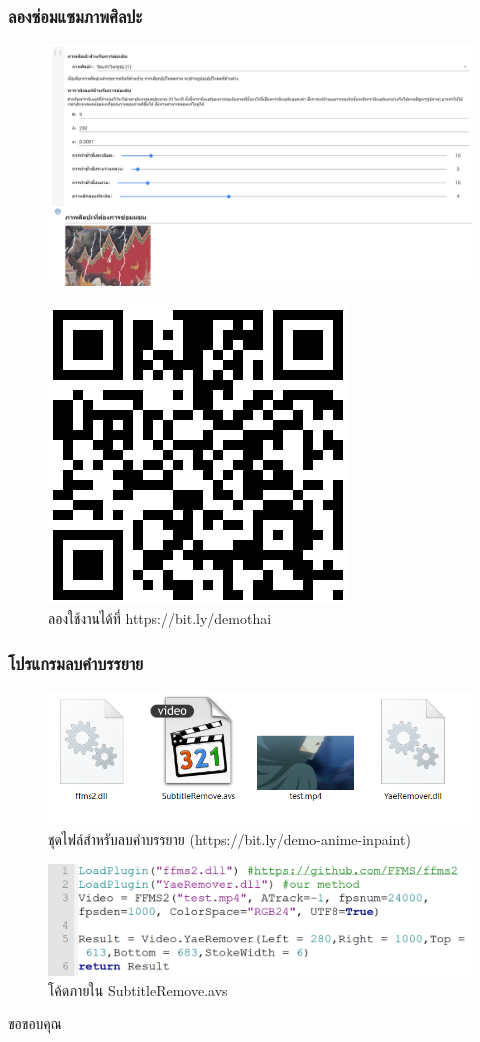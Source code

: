 \documentclass[xcolor=dvipsnames, xetex,serif]{beamer}
\numberwithin{equation}{section}
\begin{document}
    \begin{frame}
        \frametitle{ลองซ่อมแซมภาพศิลปะ}
        \centering
        \begin{figure}[H]
            \centering
            \includegraphics[width=0.7\linewidth]{images/colab_sample.png}
        \end{figure}
        \begin{figure}[H]
            \centering
            \includegraphics[width=0.1\linewidth]{images/colab_qr.png}
            \caption{ลองใช้งานได้ที่ https://bit.ly/demothai}
        \end{figure}
    \end{frame}
    \begin{frame}
		\frametitle{โปรแกรมลบคำบรรยาย}
		\begin{figure}
			\includegraphics[width=0.8\linewidth]{images/demo_anime/file.png}
			\caption{ชุดไฟล์สำหรับลบคำบรรยาย (https://bit.ly/demo-anime-inpaint)}
		\end{figure}
		\begin{figure}
			\includegraphics[width=0.8\linewidth]{images/demo_anime/notepad.png}
			\caption{โค้ดภายใน SubtitleRemove.avs}
		\end{figure}
	\end{frame}
    \begin{frame}
        \centering
        \Huge{ขอขอบคุณ}
    \end{frame}
\end{document}
